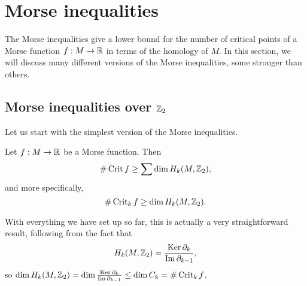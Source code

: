 \section{Morse inequalities}
The Morse inequalities give a lower bound for the number of critical points of a Morse function $f:M \to  \mathbb{R}$ in terms of the homology of $M$.
In this section, we will discuss many different versions of the Morse inequalities, some stronger than others.

\subsection{Morse inequalities over $\mathbb{Z}_2$}
Let us start with the simplest version of the Morse inequalities.

\begin{theorem}
    Let $f: M \to  \mathbb{R}$ be a Morse function. Then
    \[
        \# \operatorname{Crit} f \ge \sum \dim H_k(M, \mathbb{Z}_2)
    ,\]
    and more specifically,
    \[
        \# \operatorname{Crit}_k f \ge \dim H_k(M, \mathbb{Z}_2)
    .\]
\end{theorem}
\begin{myproof}
    With everything we have set up so far, this is actually a very straightforward result, following from the fact that \[
    H_k(M, \mathbb{Z}_2) = \frac{\operatorname{Ker} \partial_k}{\operatorname{Im} \partial_{k-1}},
    \] so $\dim H_k(M, \mathbb{Z}_2) = \dim \frac{\operatorname{Ker} \partial_k}{\operatorname{Im} \partial_{k-1}} \le  \dim C_k = \# \operatorname{Crit}_k f$.
\end{myproof}

